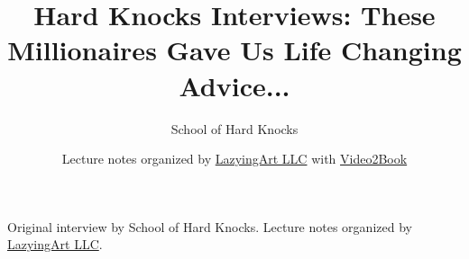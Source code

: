 \documentclass[11pt,oneside]{book}
\begin{document}
\frontmatter
\title{Hard Knocks Interviews: These Millionaires Gave Us Life Changing Advice...}
\author{School of Hard Knocks}
\date{Lecture notes organized by \href{https://lazying.art}{LazyingArt LLC} with \href{https://github.com/lachlanchen/Video2Book}{Video2Book}}
\maketitle
\begin{center}
\small Original interview by School of Hard Knocks. Lecture notes organized by \href{https://lazying.art}{LazyingArt LLC}.
\end{center}
\clearpage
\mainmatter

\end{document}
